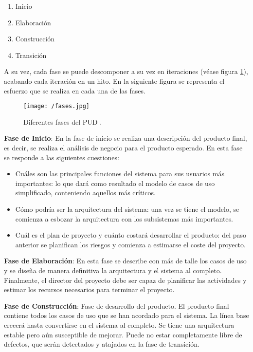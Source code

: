 \begin{enumerate}
\item Inicio
\item Elaboración
\item Construcción 
\item Transición
\end{enumerate}

A su vez, cada fase se puede descomponer a su vez en
iteraciones (véase figura \ref{fig:fases-ciclo}), acabando cada iteración en un hito. En la siguiente figura se
representa el esfuerzo que se realiza en cada una de las fases. 


\begin{figure}[!h]
  \begin{center}
    \texttt{[image: /fases.jpg]} 
    \caption{Diferentes fases del \acs{PUD} \cite{rumbaugh_jacobson_pud}.}
    \label{fig:fases-ciclo}
  \end{center}
\end{figure}



\textbf{Fase de Inicio}: En la fase de inicio se realiza una descripción del
producto final, es decir, se realiza el análisis de negocio para el producto
esperado. En esta fase se responde a las siguientes cuestiones: 

\begin{itemize}
\item Cuáles son las principales funciones del sistema para sus usuarios más
  importantes: lo que dará como resultado el modelo de casos de uso
  simplificado, conteniendo aquellos más críticos. 
\item Cómo podría ser la arquitectura del sistema: una vez se tiene el modelo,
  se comienza a esbozar la arquitectura con los subsistemas más importantes.

\item Cuál es el plan de proyecto y cuánto costará desarrollar el producto: del
  paso anterior se planifican los riesgos y comienza a estimarse el coste del
  proyecto. 
\end{itemize}


\textbf{Fase de Elaboración}: En esta fase se describe con más de talle los
casos de uso y se diseña de manera definitiva la arquitectura y el sistema al
completo. Finalmente, el director del proyecto debe ser capaz de planificar las
actividades y estimar los recursos necesarios para terminar el proyecto. 

\textbf{Fase de Construcción}: Fase de desarrollo del producto. El producto
final contiene todos los casos de uso que se han acordado para el sistema. La
línea base crecerá hasta convertirse en el sistema al completo. Se tiene una
arquitectura estable pero aún susceptible de mejorar. Puede no estar
completamente libre de defectos, que serán detectados y atajados en la fase de
transición. 

